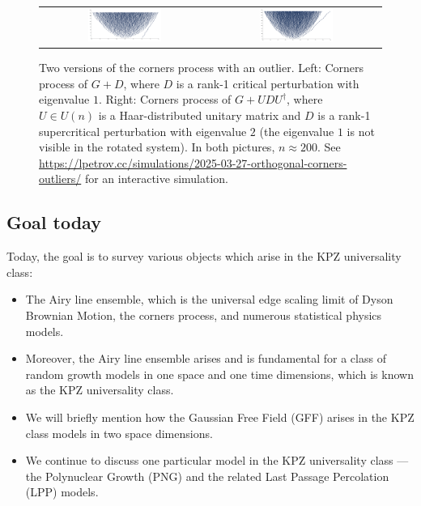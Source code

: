 \documentclass[letterpaper,11pt,oneside,reqno]{article}
\numberwithin{equation}{section}
\theoremstyle{definition}
\begin{document}
\begin{figure}[]
	\centering
	\begin{tabular}{cc}
		\includegraphics[width=0.45\textwidth]{pictures/outlier.png} &
		\includegraphics[width=0.45\textwidth]{pictures/rotated_outlier.png}
	\end{tabular}
	\caption{Two versions of the corners process with an outlier.
	Left: Corners process of $G+D$, where $D$ is a rank-1 critical perturbation with eigenvalue
	$1$. Right: Corners process of $G+UDU^\dagger$, where
	$U\in U(n)$ is a Haar-distributed unitary matrix and $D$
	is a rank-1 supercritical perturbation with eigenvalue $2$
	(the eigenvalue $1$ is not visible in the rotated system).
	In both pictures, $n\approx 200$. See
	\url{https://lpetrov.cc/simulations/2025-03-27-orthogonal-corners-outliers/}
	for an interactive simulation.}
	\label{fig:outlier-evolution}
\end{figure}


\subsection{Goal today}

Today, the goal is to survey various objects which arise in the KPZ universality class:
\begin{itemize}
	\item
		The Airy line ensemble, which is
		the universal edge scaling limit of Dyson Brownian Motion,
		the corners process, and numerous statistical physics models.

	\item
		Moreover, the Airy line ensemble arises and
		is fundamental for a class of random growth models
		in one space and one time dimensions, which is known as the KPZ universality class.

	\item
		We will briefly mention how the Gaussian Free Field (GFF) arises in the KPZ class
		models in two space dimensions.

	\item
		We continue to discuss one particular model in the KPZ universality
		class --- the Polynuclear Growth (PNG) and the related Last Passage Percolation (LPP) models.
\end{itemize}
\end{document}
